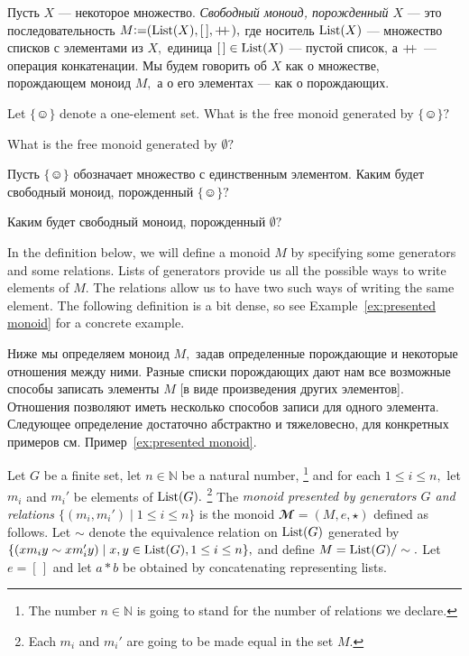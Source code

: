 \documentclass[../main/CT4S-EN-RU]{subfiles}
\begin{document}
\begin{definitionRUS}\label{def:free monoid}
Пусть $X$ — некоторое множество. {\em Свободный моноид, порожденный $X$} — это последовательность $M{\mathrel{\mathop:}=}(\operatorname{List}(X),[\,],+\!\!+\hspace{1pt}),$ где носитель $\operatorname{List}(X)$ — множество списков с элементами из $X,$ единица $[\,]\in\operatorname{List}(X)$ — пустой список, а $+\!\!+\hspace{1pt}$ — операция конкатенации. Мы будем говорить об $X$ как о множестве, порождающем моноид $M,$ а о его элементах — как о порождающих.
\end{definitionRUS}

\begin{exerciseENG}
Let ${\{☺\}}$ denote a one-element set.
\sexc What is the free monoid generated by ${\{☺\}}?$
\item What is the free monoid generated by $\emptyset?$
\endsexc
\end{exerciseENG}

\begin{exerciseRUS}
Пусть ${\{☺\}}$ обозначает множество с единственным элементом.
\sexc Каким будет свободный моноид, порожденный ${\{☺\}}?$
\item Каким будет свободный моноид, порожденный $\emptyset?$
\endsexc
\end{exerciseRUS}

\begin{blockENG}
In the definition below, we will define a monoid $M$ by specifying some generators and some relations. Lists of generators provide us all the possible ways to write elements of $M.$ The relations allow us to have two such ways of writing the same element. The following definition is a bit dense, so see Example~\ref{ex:presented monoid} for a concrete example.
\end{blockENG}

\begin{blockRUS}
Ниже мы определяем моноид $M,$ задав определенные порождающие и некоторые отношения между ними. Разные списки порождающих дают нам все возможные способы записать элементы $M$ [в виде произведения других элементов]. Отношения позволяют иметь несколько способов записи для одного элемента.%
Следующее определение достаточно абстрактно и тяжеловесно, для конкретных примеров см. Пример~\ref{ex:presented monoid}.
\end{blockRUS}

\begin{definitionENG}\label{def:presented monoid}
Let $G$ be a finite set, let $n\in{ℕ}$ be a natural number,%
\footnote{The number $n\in{ℕ}$ is going to stand for the number of relations we declare.}
and for each $1\leq i\leq n,$ let $m_i$ and $m_i'$ be elements of $\operatorname{List}(G).$%
\footnote{Each $m_i$ and $m_i'$ are going to be made equal in the set $M.$}
The {\em monoid presented by generators $G$ and relations $\{(m_i,m_i'){\;|\;}1\leq i\leq n\}$} is the monoid ${𝓜}=(M,e,{⋆})$ defined as follows. Let $\sim$ denote the equivalence relation on $\operatorname{List}(G)$ generated by $\{(xm_iy\sim xm_i'y){\;|\;}x,y\in\operatorname{List}(G), 1\leq i\leq n\},$ and define $M=\operatorname{List}(G)/\sim.$ Let $e=[\,]$ and let $a * b$ be obtained by concatenating representing lists.
\end{definitionENG}
\end{document}
